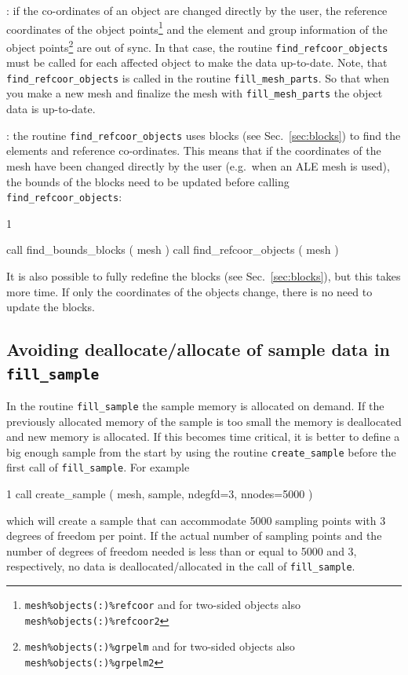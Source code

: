 : if the co-ordinates of an object are
changed directly by the user, the reference coordinates of the object
points\footnote{
\texttt{mesh\%objects(:)\%refcoor} and for two-sided objects
also \texttt{mesh\%objects(:)\%refcoor2}}
and the element and group information 
of the object points\footnote{\texttt{mesh\%objects(:)\%grpelm}
and for two-sided objects also \texttt{mesh\%objects(:)\%grpelm2}}
are out of sync.
In that case,
the routine \texttt{find\_refcoor\_objects} must be called for each
affected object to make the data up-to-date. Note, that
\texttt{find\_refcoor\_objects} is called in the routine
\texttt{fill\_mesh\_parts}. So that when you make a new mesh and finalize the
mesh with \texttt{fill\_mesh\_parts} the object data is up-to-date.

: the routine \texttt{find\_refcoor\_objects} uses blocks (see
Sec.~\ref{sec:blocks}) to find the elements and reference co-ordinates.
This means that if the coordinates of the mesh have been
changed directly by the user (e.g.\ when an ALE mesh is used),
the bounds of the blocks need to be updated before calling
\texttt{find\_refcoor\_objects}:
\begin{listing}{1}

  call find_bounds_blocks ( mesh )
  call find_refcoor_objects ( mesh )

\end{listing}
It is also possible to fully redefine the blocks (see Sec.~\ref{sec:blocks}),
but this takes more time.
If only the coordinates of the objects change,
there is no need to update the blocks.

\subsection{Avoiding deallocate/allocate of sample data in \texttt{fill\_sample}}

In the routine \texttt{fill\_sample} the sample memory is allocated on demand.
If the previously allocated memory of the sample is too small the memory is
deallocated and new memory is allocated. If this becomes time critical, it is
better to define a big enough sample from the start by using the 
routine \texttt{create\_sample} before the first call of \texttt{fill\_sample}.
For example
\begin{listing}{1}
  call create_sample ( mesh, sample, ndegfd=3, nnodes=5000 )
\end{listing}
which will create a sample that can accommodate 5000 sampling points with
3 degrees of freedom per point. If the actual number of sampling points and the
number of degrees of freedom needed is less than
or equal to 5000 and 3, respectively, no data is deallocated/allocated in the
call of \texttt{fill\_sample}.

